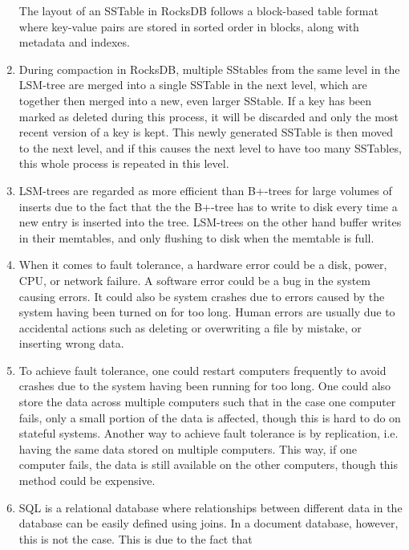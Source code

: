 \begin{enumerate}
        The layout of an SSTable in RocksDB follows a block-based table format 
        where key-value pairs are stored in sorted order in blocks, along with
        metadata and indexes.
    \item 
        During compaction in RocksDB, multiple SStables from the same level in
        the LSM-tree are merged into a single SSTable in the next level, which 
        are together then merged into a new, even larger SStable. If a key has
        been marked as deleted during this process, it will be discarded and 
        only the most recent version of a key is kept. This newly generated 
        SSTable is then moved to the next level, and if this causes the next
        level to have too many SSTables, this whole process is repeated in this
        level.
    \item 
        LSM-trees are regarded as more efficient than B+-trees for large volumes
        of inserts due to the fact that the the B+-tree has to write to disk 
        every time a new entry is inserted into the tree. LSM-trees on the other
        hand buffer writes in their memtables, and only flushing to disk when
        the memtable is full.
    \item 
        When it comes to fault tolerance, a hardware error could be a disk, 
        power, CPU, or network failure. A software error could be a bug in the
        system causing errors. It could also be system crashes due to errors 
        caused by the system having been turned on for too long. Human errors 
        are usually due to accidental actions such as deleting or overwriting a 
        file by mistake, or inserting wrong data. 
    \item 
        To achieve fault tolerance, one could restart computers frequently to
        avoid crashes due to the system having been running for too long. One 
        could also store the data across multiple computers such that in the 
        case one computer fails, only a small portion of the data is affected, 
        though this is hard to do on stateful systems. Another way to achieve
        fault tolerance is by replication, i.e. having the same data stored on
        multiple computers. This way, if one computer fails, the data is still
        available on the other computers, though this method could be expensive.
    \item
        SQL is a relational database where relationships between different data
        in the database can be easily defined using joins. In a document 
        database, however, this is not the case. This is due to the fact that 

\end{enumerate}
